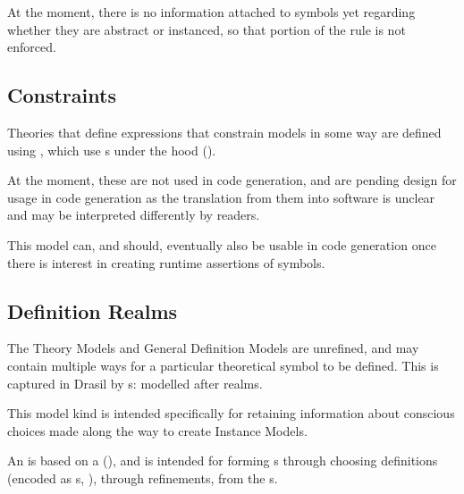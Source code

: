 At the moment, there is no information attached to symbols yet regarding whether
they are abstract or instanced, so that portion of the rule is not enforced.


\subsection{Constraints}

\currentConstraintSetHaskell{}

Theories that define expressions that constrain models in some way are defined
using \EquationalConstraints{}, which use \ConstraintSet{}s under the hood
().
	
At the moment, these are not used in code generation, and are pending design for
usage in code generation as the translation from them into software is unclear
and may be interpreted differently by readers.

This model can, and should, eventually also be usable in code generation once
there is interest in creating runtime assertions of symbols.


\subsection{Definition Realms}

\currentDefiningExprHaskell{}

\currentMultiDefnHaskell{}

The Theory Models and General Definition Models are unrefined, and may contain
multiple ways for a particular theoretical symbol to be defined. This is
captured in Drasil by \EquationalRealm{}s: modelled after realms.

This model kind is intended specifically for retaining information about
conscious choices made along the way to create Instance Models.

An \EquationalRealm{} is based on a \MultiDefn{}
(), and is intended for forming \QDefinition{}s
through choosing definitions (encoded as \DefiningExpr{}s,
), through refinements, from the \MultiDefn{}s.

